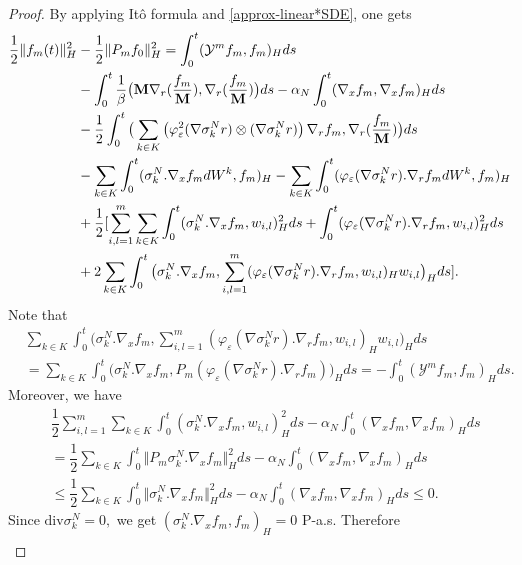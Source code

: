 \documentclass[10pt,a4paper]{amsart}
\newcommand{\Div}{\text{div}}
\begin{document}
\begin{proof} 
By applying It\^o formula and \eqref{approx-linear*SDE}, one gets
  \begin{align*}
   \dfrac{1}{2} \Vert f_m(t)\Vert_H^2&-\dfrac{1}{2}\Vert P_mf_{0}\Vert_H^2=\int_0^t(\mathcal{Y}^mf_m,f_m)_Hds  \notag\\
    &	-\int_0^t\dfrac{1}{\beta}\big(\mathbf{M}\nabla_r(\dfrac{f_m}{\mathbf{M}}),\nabla_r(\dfrac{f_m}{\mathbf{M}})\big)ds -\alpha_N\int_0^t(\nabla_x f_m,\nabla_x f_m)_Hds \notag\\&- \dfrac{1}{2}\int_0^t\big(\sum_{k\in K}\left(\varphi_\varepsilon^2(\nabla \sigma_k^Nr) \otimes (\nabla \sigma_k^Nr)\right) \nabla_rf_m,\nabla_r(\dfrac{f_m}{\mathbf{M}})\big)ds\\
            &-\sum_{k\in K}\int_0^t(\sigma_k^N.\nabla_xf_mdW^k,f_m)_H -\sum_{k\in K}\int_0^t(\varphi_\varepsilon(\nabla \sigma_k^Nr).\nabla_rf_m dW^k,f_m)_H \\
            &+\dfrac{1}{2}[\sum_{i,l=1}^m\sum_{k\in K}\int_0^t(\sigma_k^N.\nabla_xf_m,w_{i,l})_H^2 ds +\int_0^t(\varphi_\varepsilon(\nabla \sigma_k^Nr).\nabla_rf_m,w_{i,l})_H^2 ds\\
            &+2\sum_{k\in K}\int_0^t\big(\sigma_k^N.\nabla_xf_m, \sum_{i,l=1}^m(\varphi_\varepsilon(\nabla \sigma_k^Nr).\nabla_rf_m,w_{i,l})_Hw_{i,l}\big)_H ds].
\end{align*}
Note that 
\begin{align*}
    &\sum_{k\in K}\int_0^t\big(\sigma_k^N.\nabla_xf_m, \sum_{i,l=1}^m(\varphi_\varepsilon(\nabla \sigma_k^Nr).\nabla_rf_m,w_{i,l})_Hw_{i,l}\big)_H ds\\&=\sum_{k\in K}\int_0^t\big(\sigma_k^N.\nabla_xf_m, P_m(\varphi_\varepsilon(\nabla \sigma_k^Nr).\nabla_rf_m)\big)_H ds=-\int_0^t(\mathcal{Y}^mf_m,f_m)_Hds.
\end{align*}
Moreover, we have 
\begin{align*}
    &\dfrac{1}{2}\sum_{i,l=1}^m\sum_{k\in K}\int_0^t(\sigma_k^N.\nabla_xf_m,w_{i,l})_H^2 ds-\alpha_N\int_0^t(\nabla_x f_m,\nabla_x f_m)_Hds\\&=\dfrac{1}{2}\sum_{k\in K}\int_0^t\Vert P_m\sigma_k^N.\nabla_xf_m\Vert_H^2 ds-\alpha_N\int_0^t(\nabla_x f_m,\nabla_x f_m)_Hds\\
    &\leq  \dfrac{1}{2}\sum_{k\in K}\int_0^t\Vert \sigma_k^N.\nabla_xf_m\Vert_H^2 ds-\alpha_N\int_0^t(\nabla_x f_m,\nabla_x f_m)_Hds\leq 0.
\end{align*}
Since $\Div \sigma_k^N=0,$ we get $(\sigma_k^N.\nabla_xf_m,f_m)_H=0$ P-a.s. Therefore
\begin{align}

\end{align}
\end{proof}
\end{document}
